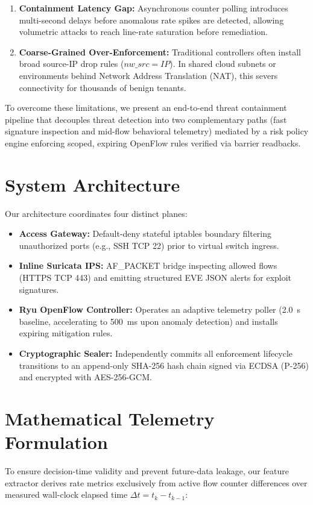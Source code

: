 \documentclass[conference]{IEEEtran}
\begin{document}
\begin{enumerate}
    \item \textbf{Containment Latency Gap:} Asynchronous counter polling introduces multi-second delays before anomalous rate spikes are detected, allowing volumetric attacks to reach line-rate saturation before remediation.
    \item \textbf{Coarse-Grained Over-Enforcement:} Traditional controllers often install broad source-IP drop rules ($nw\_src = IP$). In shared cloud subnets or environments behind Network Address Translation (NAT), this severs connectivity for thousands of benign tenants.
\end{enumerate}

To overcome these limitations, we present an end-to-end threat containment pipeline that decouples threat detection into two complementary paths (fast signature inspection and mid-flow behavioral telemetry) mediated by a risk policy engine enforcing scoped, expiring OpenFlow rules verified via barrier readbacks.

\section{System Architecture}
Our architecture coordinates four distinct planes:
\begin{itemize}
    \item \textbf{Access Gateway:} Default-deny stateful iptables boundary filtering unauthorized ports (e.g., SSH TCP 22) prior to virtual switch ingress.
    \item \textbf{Inline Suricata IPS:} AF\_PACKET bridge inspecting allowed flows (HTTPS TCP 443) and emitting structured EVE JSON alerts for exploit signatures.
    \item \textbf{Ryu OpenFlow Controller:} Operates an adaptive telemetry poller (2.0~s baseline, accelerating to 500~ms upon anomaly detection) and installs expiring mitigation rules.
    \item \textbf{Cryptographic Sealer:} Independently commits all enforcement lifecycle transitions to an append-only SHA-256 hash chain signed via ECDSA (P-256) and encrypted with AES-256-GCM.
\end{itemize}

\section{Mathematical Telemetry Formulation}
To ensure decision-time validity and prevent future-data leakage, our feature extractor derives rate metrics exclusively from active flow counter differences over measured wall-clock elapsed time $\Delta t = t_k - t_{k-1}$:
\end{document}
